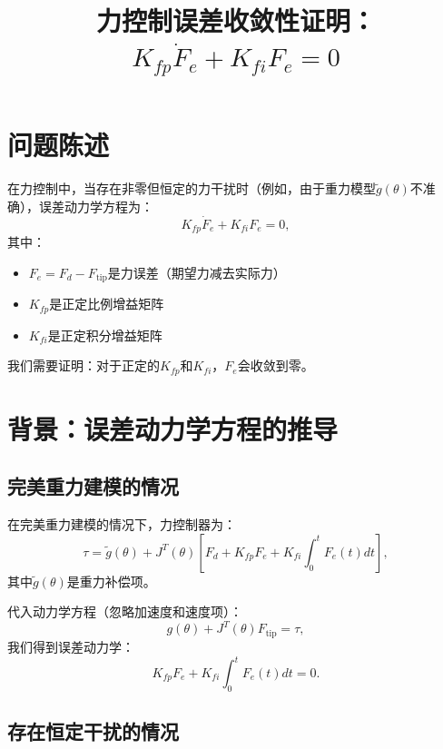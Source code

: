 \documentclass{article}
\title{力控制误差收敛性证明：$K_{fp}\dot{F}_e + K_{fi}F_e = 0$}
\author{}
\date{}
\begin{document}
\maketitle

\section{问题陈述}

在力控制中，当存在非零但恒定的力干扰时（例如，由于重力模型$\tilde{g}(\theta)$不准确），误差动力学方程为：
\begin{equation}
K_{fp}\dot{F}_e + K_{fi}F_e = 0, \tag{67}
\end{equation}
其中：
\begin{itemize}
\item $F_e = F_d - F_{\text{tip}}$是力误差（期望力减去实际力）
\item $K_{fp}$是正定比例增益矩阵
\item $K_{fi}$是正定积分增益矩阵
\end{itemize}

我们需要证明：对于正定的$K_{fp}$和$K_{fi}$，$F_e$会收敛到零。

\section{背景：误差动力学方程的推导}

\subsection{完美重力建模的情况}

在完美重力建模的情况下，力控制器为：
\begin{equation}
\tau = \tilde{g}(\theta) + J^T(\theta)\left[F_d + K_{fp}F_e + K_{fi}\int_0^t F_e(t)dt\right],
\end{equation}
其中$\tilde{g}(\theta)$是重力补偿项。

代入动力学方程（忽略加速度和速度项）：
\begin{equation}
g(\theta) + J^T(\theta)F_{\text{tip}} = \tau,
\end{equation}
我们得到误差动力学：
\begin{equation}
K_{fp}F_e + K_{fi}\int_0^t F_e(t)dt = 0. \tag{11.52}
\end{equation}

\subsection{存在恒定干扰的情况}
\end{document}
